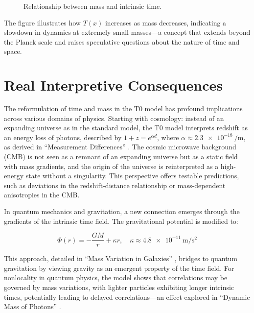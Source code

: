 \documentclass[a4paper,12pt]{article}
\newcommand{\Tfield}{T(x)}
\begin{document}
	\begin{figure}[h]
		\centering
		\caption{Relationship between mass and intrinsic time.}
	\end{figure}
	
	The figure illustrates how \(\Tfield\) increases as mass decreases, indicating a slowdown in dynamics at extremely small masses—a concept that extends beyond the Planck scale and raises speculative questions about the nature of time and space.
	
	\section{Real Interpretive Consequences}
	
	The reformulation of time and mass in the T0 model has profound implications across various domains of physics. Starting with cosmology: instead of an expanding universe as in the standard model, the T0 model interprets redshift as an energy loss of photons, described by \(1 + z = e^{\alpha d}\), where \(\alpha \approx \SI{2.3e-18}{\per\meter}\), as derived in “Measurement Differences” \cite{pascher_messdifferenzen_2025}. The cosmic microwave background (CMB) is not seen as a remnant of an expanding universe but as a static field with mass gradients, and the origin of the universe is reinterpreted as a high-energy state without a singularity. This perspective offers testable predictions, such as deviations in the redshift-distance relationship or mass-dependent anisotropies in the CMB.
	
	In quantum mechanics and gravitation, a new connection emerges through the gradients of the intrinsic time field. The gravitational potential is modified to:
	
	\begin{equation}
		\Phi(r) = -\frac{G M}{r} + \kappa r, \quad \kappa \approx \SI{4.8e-11}{\meter\per\second\squared}
	\end{equation}
	
	This approach, detailed in “Mass Variation in Galaxies” \cite{pascher_galaxies_2025}, bridges to quantum gravitation by viewing gravity as an emergent property of the time field. For nonlocality in quantum physics, the model shows that correlations may be governed by mass variations, with lighter particles exhibiting longer intrinsic times, potentially leading to delayed correlations—an effect explored in “Dynamic Mass of Photons” \cite{pascher_photons_2025}.
	
\end{document}
